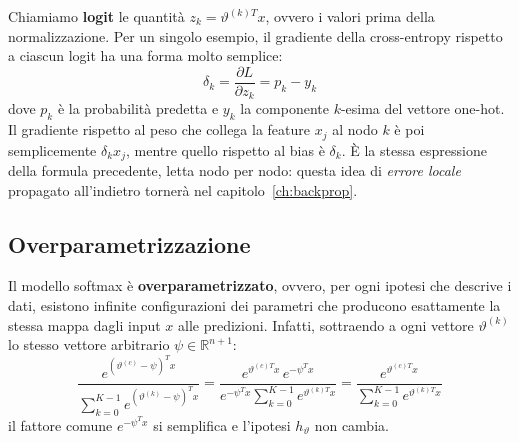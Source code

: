 \begin{osservazione}
Chiamiamo \textbf{logit} le quantità $z_k = \vartheta^{(k)T}x$, ovvero i valori prima della normalizzazione. Per un singolo esempio, il gradiente della cross-entropy rispetto a ciascun logit ha una forma molto semplice:
\[
\delta_k = \frac{\partial L}{\partial z_k} = p_k - y_k
\]
dove $p_k$ è la probabilità predetta e $y_k$ la componente $k$-esima del vettore one-hot. Il gradiente rispetto al peso che collega la feature $x_j$ al nodo $k$ è poi semplicemente $\delta_k x_j$, mentre quello rispetto al bias è $\delta_k$. È la stessa espressione della formula precedente, letta nodo per nodo: questa idea di \emph{errore locale} propagato all'indietro tornerà nel capitolo~\ref{ch:backprop}.
\end{osservazione}

\subsection{Overparametrizzazione}
Il modello softmax è \textbf{overparametrizzato}, ovvero, per ogni ipotesi che descrive i dati, esistono infinite configurazioni dei parametri che producono esattamente la stessa mappa dagli input $x$ alle predizioni. Infatti, sottraendo a ogni vettore $\vartheta^{(k)}$ lo stesso vettore arbitrario $\psi \in \mathbb{R}^{n+1}$:
\[
\frac{e^{(\vartheta^{(c)} - \psi)^T x}}{\displaystyle\sum_{k=0}^{K-1} e^{(\vartheta^{(k)} - \psi)^T x}}
= \frac{e^{\vartheta^{(c)T} x}\, e^{-\psi^T x}}{e^{-\psi^T x}\displaystyle\sum_{k=0}^{K-1} e^{\vartheta^{(k)T} x}}
= \frac{e^{\vartheta^{(c)T} x}}{\displaystyle\sum_{k=0}^{K-1} e^{\vartheta^{(k)T} x}}
\]
il fattore comune $e^{-\psi^T x}$ si semplifica e l'ipotesi $h_\vartheta$ non cambia.

